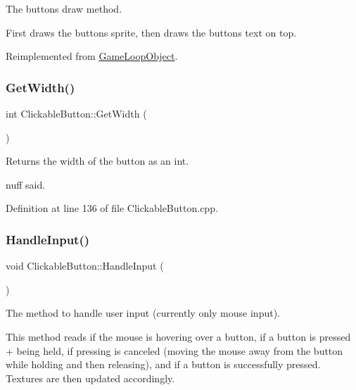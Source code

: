 The button\textquotesingle{}s draw method. 

First draws the button\textquotesingle{}s sprite, then draws the button\textquotesingle{}s text on top. 

Reimplemented from \hyperlink{class_game_loop_object_a0572a88e5b98fa8a41078260d152202d}{Game\+Loop\+Object}.

\mbox{\label{class_clickable_button_a45a3f33e2e11191afb413617a665d2f5}} 
\subsubsection{\texorpdfstring{Get\+Width()}{GetWidth()}}
{\footnotesize\ttfamily int Clickable\+Button\+::\+Get\+Width (\begin{DoxyParamCaption}{ }\end{DoxyParamCaption})}



Returns the width of the button as an int. 

\textquotesingle{}nuff said. 

Definition at line 136 of file Clickable\+Button.\+cpp.

\mbox{\label{class_clickable_button_a939a1f2a5414c37e9c1c1310db576224}} 
\subsubsection{\texorpdfstring{Handle\+Input()}{HandleInput()}}
{\footnotesize\ttfamily void Clickable\+Button\+::\+Handle\+Input (\begin{DoxyParamCaption}{ }\end{DoxyParamCaption})\hspace{0.3cm}{\ttfamily [virtual]}}



The method to handle user input (currently only mouse input). 

This method reads if the mouse is hovering over a button, if a button is pressed + being held, if pressing is canceled (moving the mouse away from the button while holding and then releasing), and if a button is successfully pressed. Textures are then updated accordingly. 

